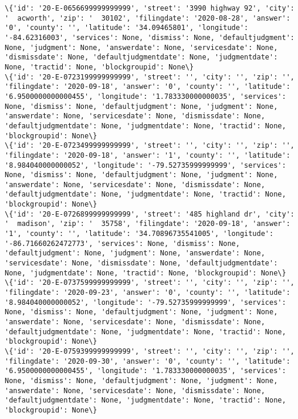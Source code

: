 \documentclass[11pt]{article}
\begin{document}
\begin{Verbatim}[commandchars=\\\{\}]
\{'id': '20-E-0656699999999999', 'street': '3990 highway 92', 'city': '  acworth', 'zip': '  30102', 'filingdate': '2020-08-28', 'answer': '0', 'county': '', 'latitude': '34.09465801', 'longitude': '-84.62316003', 'services': None, 'dismiss': None, 'defaultjudgment': None, 'judgment': None, 'answerdate': None, 'servicesdate': None, 'dismissdate': None, 'defaultjudgmentdate': None, 'judgmentdate': None, 'tractid': None, 'blockgroupid': None\}
\{'id': '20-E-0723199999999999', 'street': '', 'city': '', 'zip': '', 'filingdate': '2020-09-18', 'answer': '0', 'county': '', 'latitude': '6.9500000000000455', 'longitude': '1.783330000000035', 'services': None, 'dismiss': None, 'defaultjudgment': None, 'judgment': None, 'answerdate': None, 'servicesdate': None, 'dismissdate': None, 'defaultjudgmentdate': None, 'judgmentdate': None, 'tractid': None, 'blockgroupid': None\}
\{'id': '20-E-0723499999999999', 'street': '', 'city': '', 'zip': '', 'filingdate': '2020-09-18', 'answer': '1', 'county': '', 'latitude': '8.984040000000052', 'longitude': '-79.52735999999999', 'services': None, 'dismiss': None, 'defaultjudgment': None, 'judgment': None, 'answerdate': None, 'servicesdate': None, 'dismissdate': None, 'defaultjudgmentdate': None, 'judgmentdate': None, 'tractid': None, 'blockgroupid': None\}
\{'id': '20-E-0726899999999999', 'street': '485 highland dr', 'city': '  madison', 'zip': '  35758', 'filingdate': '2020-09-18', 'answer': '1', 'county': '', 'latitude': '34.70896735541005', 'longitude': '-86.71660262472773', 'services': None, 'dismiss': None, 'defaultjudgment': None, 'judgment': None, 'answerdate': None, 'servicesdate': None, 'dismissdate': None, 'defaultjudgmentdate': None, 'judgmentdate': None, 'tractid': None, 'blockgroupid': None\}
\{'id': '20-E-0737599999999999', 'street': '', 'city': '', 'zip': '', 'filingdate': '2020-09-23', 'answer': '0', 'county': '', 'latitude': '8.984040000000052', 'longitude': '-79.52735999999999', 'services': None, 'dismiss': None, 'defaultjudgment': None, 'judgment': None, 'answerdate': None, 'servicesdate': None, 'dismissdate': None, 'defaultjudgmentdate': None, 'judgmentdate': None, 'tractid': None, 'blockgroupid': None\}
\{'id': '20-E-0759399999999999', 'street': '', 'city': '', 'zip': '', 'filingdate': '2020-09-30', 'answer': '0', 'county': '', 'latitude': '6.9500000000000455', 'longitude': '1.783330000000035', 'services': None, 'dismiss': None, 'defaultjudgment': None, 'judgment': None, 'answerdate': None, 'servicesdate': None, 'dismissdate': None, 'defaultjudgmentdate': None, 'judgmentdate': None, 'tractid': None, 'blockgroupid': None\}

\end{Verbatim}
\end{document}
